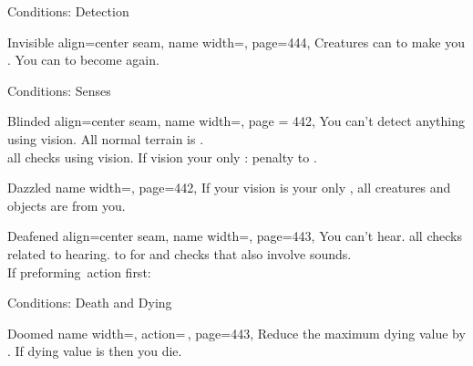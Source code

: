 \begin{PageFront}
\begin{Tables}{\frontTableHeight}
\begin{Table}{Conditions: Detection}
\begin{entry}{Invisible}{%
                align=center seam,
                name width=\conditionLength,%
                page=444,
            }
                Creatures can  to make you \Hidden. You can  to become \Undetected again.
                \hfill {}
            \end{entry}
        \end{Table}
        \TableSpace
        \begin{Table}{Conditions: Senses}
            \begin{entry}{Blinded}{%
                align=center seam,
                name width=\conditionLength,%
                page = 442,
            }
                You can't detect anything using vision. All normal terrain is .\hfill
                 \\
                 all \PerceptionT checks using vision.
                If vision your only \PreciseSense:  \Status penalty to \PerceptionT.\hfill
            \end{entry}
            \begin{entry}{Dazzled}{%
                name width=\conditionLength,%
                page=442,
            }
                If your vision is your only \PreciseSense, all creatures and objects are \Concealed from you.
            \end{entry}
            \begin{entry}{Deafened}{%
                align=center seam,
                name width=\conditionLength,%
                page=443,
            }
                You can't hear. \hfill
                 all checks \PerceptionT related to hearing. \hfill
                 to \PerceptionT for  and checks that also involve sounds. \\
                If preforming \Auditory\,action first: \Flat[][val=5]  \hfill
            \end{entry}
        \end{Table}
        \TableSpace
        \begin{Table}{Conditions: Death and Dying}
            \begin{entry}{Doomed}{%
                name width=\conditionLength,%
                action=\,\X,
                page=443,
            }
                Reduce the maximum dying value by \X.\quad
                If dying value is  then you die. \hfill

\end{entry}
\end{Table}
\end{Tables}
\end{PageFront}

